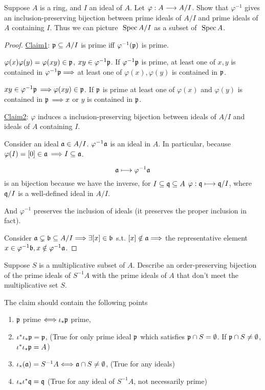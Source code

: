 \begin{exr}\label{exr:spec_quotient}
Suppose $A$ is a ring, and $I$ an ideal of $A$. Let $\varphi:A\longrightarrow A/I$. Show that $\varphi^{-1}$ gives an inclusion-preserving bijection between prime ideals of $A/I$ and prime ideals of $A$ containing $I$. Thus we can picture $\text{ Spec\,} A/I$ as a subset of $\text{ Spec\,} A$.
\end{exr}
\begin{proof}
\underline{Claim1}: ${\mathfrak p}\subseteq A/I$ is prime iff 
$\varphi^{-1}({\mathfrak p})$ is prime.

$\varphi(x)\varphi(y)=\varphi(xy)\in {\mathfrak p}$, $xy\in\varphi^{-1}{\mathfrak p}$. If $\varphi^{-1}{\mathfrak p}$ is prime, at least one of $x,y$ is contained in $\varphi^{-1}{\mathfrak p}\Longrightarrow $ at least one of $\varphi(x),\varphi(y)$ is contained in ${\mathfrak p}$.

$xy\in \varphi^{-1}{\mathfrak p}$ $\Longrightarrow \varphi(xy)\in {\mathfrak p}$. If ${\mathfrak p}$ is prime  at least one of $\varphi(x)$ and $\varphi(y)$ is contained in ${\mathfrak p}$ $\Longrightarrow x$ or $y$ is  contained in ${\mathfrak p}$.

\underline{Claim2}: $\varphi$ induces a inclusion-preserving bijection between ideals of $A/I$ and ideals of $A$ containing $I$.

Consider an ideal ${\mathfrak a}\in A/I$. $\varphi^{-1}{\mathfrak a}$ is  an ideal in $A$. In particular, because $\varphi(I)=[0]\in{\mathfrak a}$ $\Longrightarrow I\subseteq {\mathfrak a}$.

$$
{\mathfrak a}\longmapsto \varphi^{-1}{\mathfrak a}
$$
is an bijection because we have the inverse, for $I\subseteq\mathfrak q\subseteq A$ $\varphi:\mathfrak q\longmapsto \mathfrak q/I$, where $\mathfrak q/I$ is a well-defined ideal in $A/I$.

And $\varphi^{-1}$ preserves the inclusion of ideals (it preserves the proper inclusion in fact). 

Consider ${\mathfrak a}\subsetneq {\mathfrak b}\subseteq A/I\Longrightarrow \exists [x]\in {\mathfrak b}$ s.t. $[x]\notin {\mathfrak a}\Longrightarrow$ the representative element $x\in \varphi^{-1}{\mathfrak b}, x\notin\varphi^{-1}{\mathfrak a}$.
\end{proof}

\begin{exr}\label{exr:spec_localization}
Suppose $S$ is a multiplicative subset of $A$. Describe an order-preserving bijection of the prime ideals of $S^{-1}A$ with the prime ideals of $A$ that don’t meet the multiplicative set $S$.

The claim should contain the following points
\begin{enumerate}[label=(\alph*)]
\item ${\mathfrak p}$ prime $\Longleftrightarrow \iota_*{\mathfrak p}$ prime,
\item $\iota^*\iota_*{\mathfrak p}={\mathfrak p}$, (True for only prime ideal ${\mathfrak p}$ which satisfies ${\mathfrak p}\cap S=\emptyset$. If ${\mathfrak p}\cap S\neq \emptyset$, $\iota^*\iota_*{\mathfrak p}={A}$)
\item $\iota_*({\mathfrak a})= S^{-1}{A}\Longleftrightarrow{\mathfrak a}\cap S\neq \emptyset$, (True for any ideals)
\item  $\iota_*\iota^*\mathfrak q=\mathfrak q$ (True for any ideal of $S^{-1}{A}$, not necessarily prime)
\end{enumerate}
\end{exr}

